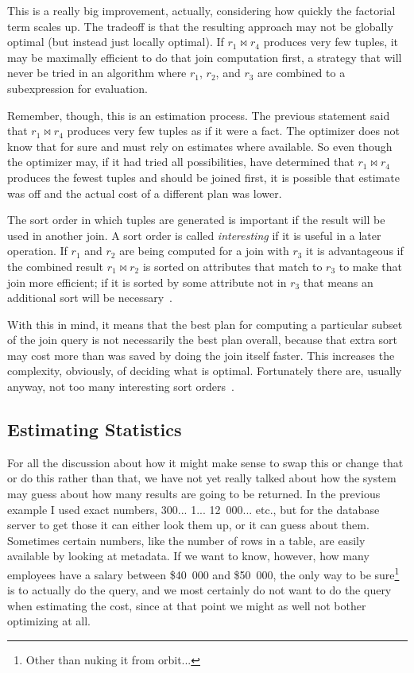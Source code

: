 This is a really big improvement, actually, considering how quickly the factorial term scales up. The tradeoff is that the resulting approach may not be globally optimal (but instead just locally optimal). If $r_{1} \bowtie r_{4}$ produces very few tuples, it may be maximally efficient to do that join computation first, a strategy that will never be tried in an algorithm where $r_{1}$, $r_{2}$, and $r_{3}$ are combined to a subexpression for evaluation. 

Remember, though, this is an estimation process. The previous statement said that $r_{1} \bowtie r_{4}$ produces very few tuples as if it were a fact. The optimizer does not know that for sure and must rely on estimates where available. So even though the optimizer may, if it had tried all possibilities, have determined that $r_{1} \bowtie r_{4}$ produces the fewest tuples and should be joined first, it is possible that estimate was off and the actual cost of a different plan was lower.

The sort order in which tuples are generated is important if the result will be used in another join. A sort order is called \textit{interesting} if it is useful in a later operation. If $r_{1}$ and $r_{2}$ are being computed for a join with $r_{3}$ it is advantageous if the combined result $r_{1} \bowtie r_{2}$ is sorted on attributes that match to $r_{3}$ to make that join more efficient; if it is sorted by some attribute not in $r_{3}$ that means an additional sort will be necessary~\cite{dsc}.

With this in mind, it means that the best plan for computing a particular subset of the join query is not necessarily the best plan overall, because that extra sort may cost more than was saved by doing the join itself faster. This increases the complexity, obviously, of deciding what is optimal. Fortunately there are, usually anyway, not too many interesting sort orders~\cite{dsc}. 

\subsection*{Estimating Statistics}

For all the discussion about how it might make sense to swap this or change that or do this rather than that, we have not yet really talked about how the system may guess about how many results are going to be returned. In the previous example I used exact numbers, 300... 1... 12~000... etc., but for the database server to get those it can either look them up, or it can guess about them. Sometimes certain numbers, like the number of rows in a table, are easily available by looking at metadata. If we want to know, however, how many employees have a salary between \$40~000 and \$50~000, the only way to be sure\footnote{Other than nuking it from orbit...} is to actually do the query, and we most certainly do not want to do the query when estimating the cost, since at that point we might as well not bother optimizing at all.

